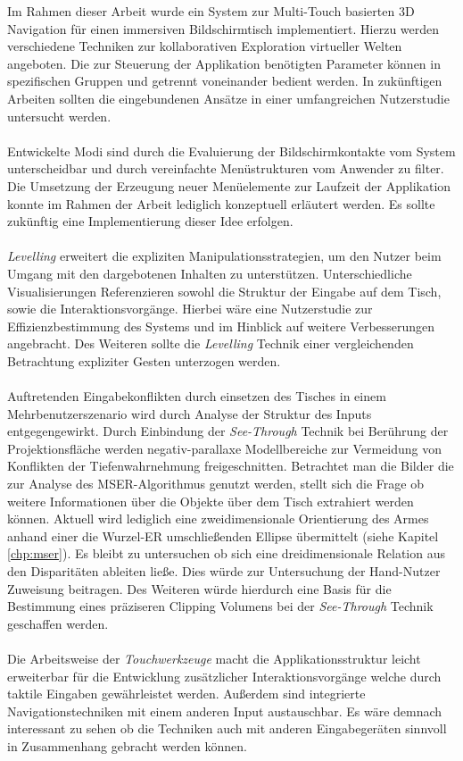 Im Rahmen dieser Arbeit wurde ein System zur Multi-Touch basierten 3D Navigation für einen immersiven Bildschirmtisch implementiert. Hierzu werden verschiedene Techniken zur kollaborativen Exploration virtueller Welten angeboten. Die zur Steuerung der Applikation benötigten Parameter können in spezifischen Gruppen und getrennt voneinander bedient werden. In zukünftigen Arbeiten sollten die eingebundenen Ansätze in einer umfangreichen Nutzerstudie untersucht werden.
\\\\
Entwickelte Modi sind durch die Evaluierung der Bildschirmkontakte vom System unterscheidbar und durch vereinfachte Menüstrukturen vom Anwender zu filter. Die Umsetzung der Erzeugung neuer Menüelemente zur Laufzeit der Applikation konnte im Rahmen der Arbeit lediglich konzeptuell erläutert werden. Es sollte zukünftig eine Implementierung dieser Idee erfolgen.
\\\\
\emph{Levelling} erweitert die expliziten Manipulationsstrategien, um den Nutzer beim Umgang mit den dargebotenen Inhalten zu unterstützen. Unterschiedliche Visualisierungen Referenzieren sowohl die Struktur der Eingabe auf dem Tisch, sowie die Interaktionsvorgänge. Hierbei wäre eine Nutzerstudie zur Effizienzbestimmung des Systems und im Hinblick auf weitere Verbesserungen angebracht. Des Weiteren sollte die \emph{Levelling} Technik einer vergleichenden Betrachtung expliziter Gesten unterzogen werden.  
\\\\
Auftretenden Eingabekonflikten durch einsetzen des Tisches in einem Mehrbenutzerszenario wird durch Analyse der Struktur des Inputs entgegengewirkt. Durch Einbindung der \emph{See-Through} Technik bei Berührung der Projektionsfläche werden negativ-parallaxe Modellbereiche zur Vermeidung von Konflikten der Tiefenwahrnehmung freigeschnitten. Betrachtet man die Bilder die zur Analyse des MSER-Algorithmus genutzt werden, stellt sich die Frage ob weitere Informationen über die Objekte über dem Tisch extrahiert werden können. Aktuell wird lediglich eine zweidimensionale Orientierung des Armes anhand einer die Wurzel-ER umschließenden Ellipse übermittelt (siehe Kapitel \ref{chp:mser}). Es bleibt zu untersuchen ob sich eine dreidimensionale Relation aus den Disparitäten ableiten ließe. Dies würde zur Untersuchung der Hand-Nutzer Zuweisung beitragen. Des Weiteren würde hierdurch eine Basis für die Bestimmung eines präziseren Clipping Volumens bei der \emph{See-Through} Technik geschaffen werden.
\\\\
Die Arbeitsweise der \emph{Touchwerkzeuge} macht die Applikationsstruktur leicht erweiterbar für die Entwicklung zusätzlicher Interaktionsvorgänge welche durch taktile Eingaben gewährleistet werden. Außerdem sind integrierte Navigationstechniken mit einem anderen Input austauschbar. Es wäre demnach interessant zu sehen ob die Techniken auch mit anderen Eingabegeräten sinnvoll in Zusammenhang gebracht werden können.
